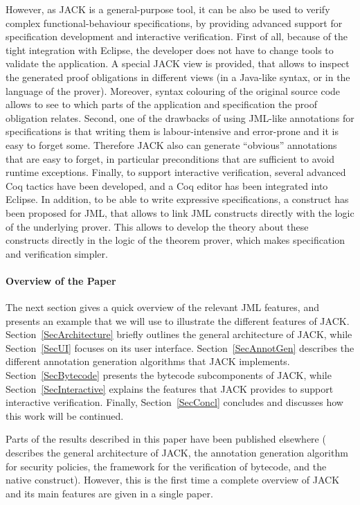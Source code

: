 However, as JACK is a general-purpose tool, it can be also be used to
verify complex functional-behaviour specifications, by providing
advanced support for specification development and interactive
verification. First of all, because of the tight integration with
Eclipse, the developer does not have to change tools to validate the
application. A special JACK view is provided, that allows to inspect
the generated proof obligations in different views (in a Java-like
syntax, or in the language of the prover). Moreover, syntax colouring
of the original source code allows to see to which parts of the
application and specification the proof obligation relates. Second,
one of the drawbacks of using JML-like annotations for specifications
is that writing them is labour-intensive and error-prone and it is
easy to forget some. Therefore JACK also can generate ``obvious''
annotations that are easy to forget, in particular preconditions that
are sufficient to avoid runtime exceptions. Finally, to support
interactive verification, several advanced Coq tactics have been
developed, and a Coq editor has been integrated into Eclipse. In
addition, to be able to write expressive specifications, a
\native construct has been proposed for JML, that allows to
link JML constructs directly with the logic of the underlying
prover. This allows to develop the theory about these constructs
directly in the logic of the theorem prover, which makes specification
and verification simpler.


\paragraph{Overview of the Paper}
The next section gives a quick overview of the relevant JML features,
and presents an example that we will use to illustrate the different
features of JACK. Section~\ref{SecArchitecture} briefly outlines the
general architecture of JACK, while Section~\ref{SecUI} focuses on its
user interface. Section~\ref{SecAnnotGen} describes the different
annotation generation algorithms that JACK
implements. Section~\ref{SecBytecode} presents the bytecode
subcomponents of JACK, while Section~\ref{SecInteractive} explains the
features that JACK provides to support interactive
verification. Finally, Section~\ref{SecConcl} concludes and discusses
how this work will be continued.

Parts of the results described in this paper have been published
elsewhere (\cite{BurdyRL03} describes the general architecture of
JACK, \cite{PavlovaBBHL04} the annotation generation algorithm
for security policies, \cite{BurdyP06} the framework for the
verification of bytecode, and \cite{Charles06} the native
construct). However, this is the first time a complete overview of
JACK and its main features are given in a single paper.


